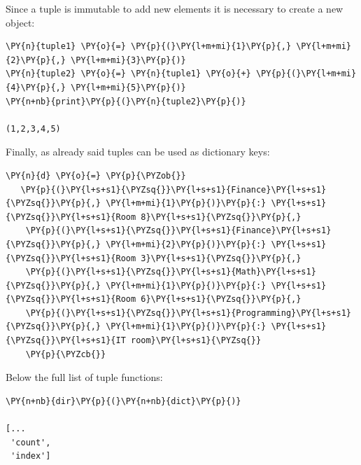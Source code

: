 Since a tuple is immutable to add new elements it is necessary to create a new object:

\begin{tcolorbox}[breakable, size=fbox, boxrule=1pt, pad at break*=1mm, colback=cellbackground, colframe=cellborder]\begin{Verbatim}[commandchars=\\\{\}]
\PY{n}{tuple1} \PY{o}{=} \PY{p}{(}\PY{l+m+mi}{1}\PY{p}{,} \PY{l+m+mi}{2}\PY{p}{,} \PY{l+m+mi}{3}\PY{p}{)}
\PY{n}{tuple2} \PY{o}{=} \PY{n}{tuple1} \PY{o}{+} \PY{p}{(}\PY{l+m+mi}{4}\PY{p}{,} \PY{l+m+mi}{5}\PY{p}{)}
\PY{n+nb}{print}\PY{p}{(}\PY{n}{tuple2}\PY{p}{)}

(1,2,3,4,5)
\end{Verbatim}
\end{tcolorbox}

Finally, as already said tuples can be used as dictionary keys:

\begin{tcolorbox}[breakable, size=fbox, boxrule=1pt, pad at break*=1mm, colback=cellbackground, colframe=cellborder]\begin{Verbatim}[commandchars=\\\{\}]
\PY{n}{d} \PY{o}{=} \PY{p}{\PYZob{}}
   \PY{p}{(}\PY{l+s+s1}{\PYZsq{}}\PY{l+s+s1}{Finance}\PY{l+s+s1}{\PYZsq{}}\PY{p}{,} \PY{l+m+mi}{1}\PY{p}{)}\PY{p}{:} \PY{l+s+s1}{\PYZsq{}}\PY{l+s+s1}{Room 8}\PY{l+s+s1}{\PYZsq{}}\PY{p}{,}
    \PY{p}{(}\PY{l+s+s1}{\PYZsq{}}\PY{l+s+s1}{Finance}\PY{l+s+s1}{\PYZsq{}}\PY{p}{,} \PY{l+m+mi}{2}\PY{p}{)}\PY{p}{:} \PY{l+s+s1}{\PYZsq{}}\PY{l+s+s1}{Room 3}\PY{l+s+s1}{\PYZsq{}}\PY{p}{,}
    \PY{p}{(}\PY{l+s+s1}{\PYZsq{}}\PY{l+s+s1}{Math}\PY{l+s+s1}{\PYZsq{}}\PY{p}{,} \PY{l+m+mi}{1}\PY{p}{)}\PY{p}{:} \PY{l+s+s1}{\PYZsq{}}\PY{l+s+s1}{Room 6}\PY{l+s+s1}{\PYZsq{}}\PY{p}{,}
    \PY{p}{(}\PY{l+s+s1}{\PYZsq{}}\PY{l+s+s1}{Programming}\PY{l+s+s1}{\PYZsq{}}\PY{p}{,} \PY{l+m+mi}{1}\PY{p}{)}\PY{p}{:} \PY{l+s+s1}{\PYZsq{}}\PY{l+s+s1}{IT room}\PY{l+s+s1}{\PYZsq{}}
    \PY{p}{\PYZcb{}}
\end{Verbatim}
\end{tcolorbox}

Below the full list of tuple functions:
\begin{tcolorbox}[breakable, size=fbox, boxrule=1pt, pad at break*=1mm,colback=cellbackground, colframe=cellborder]
\begin{Verbatim}[commandchars=\\\{\}]
\PY{n+nb}{dir}\PY{p}{(}\PY{n+nb}{dict}\PY{p}{)}

[...
 'count',
 'index']
\end{Verbatim}
\end{tcolorbox}
